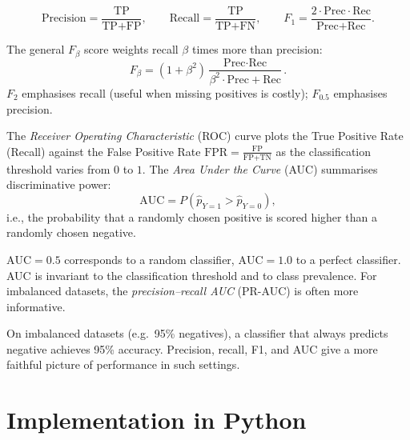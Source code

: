 \begin{definition}
\[
    \text{Precision} = \frac{\text{TP}}{\text{TP}+\text{FP}},
    \qquad
    \text{Recall} = \frac{\text{TP}}{\text{TP}+\text{FN}},
    \qquad
    F_1 = \frac{2 \cdot \text{Prec} \cdot \text{Rec}}{\text{Prec}+\text{Rec}}.
\]
\end{definition}

\begin{proposition}
The general $F_\beta$ score weights recall $\beta$ times more than precision:
\[
    F_\beta = (1+\beta^2)\frac{\text{Prec}\cdot\text{Rec}}{\beta^2\cdot\text{Prec}+\text{Rec}}.
\]
$F_2$ emphasises recall (useful when missing positives is costly); $F_{0.5}$ emphasises precision.
\end{proposition}

\begin{definition}
The \emph{Receiver Operating Characteristic} (ROC) curve plots the True Positive Rate (Recall) against the False Positive Rate $\text{FPR} = \frac{\text{FP}}{\text{FP}+\text{TN}}$ as the classification threshold varies from $0$ to $1$. The \emph{Area Under the Curve} (AUC) summarises discriminative power:
\[
    \text{AUC} = P(\hat{p}_{Y=1} > \hat{p}_{Y=0}),
\]
i.e., the probability that a randomly chosen positive is scored higher than a randomly chosen negative.
\end{definition}

\begin{proposition}
$\text{AUC} = 0.5$ corresponds to a random classifier, $\text{AUC} = 1.0$ to a perfect classifier. AUC is invariant to the classification threshold and to class prevalence. For imbalanced datasets, the \emph{precision--recall AUC} (PR-AUC) is often more informative.
\end{proposition}

\begin{warning}[title=\textbf{Accuracy Is Not Enough}]
On imbalanced datasets (e.g.\ 95\% negatives), a classifier that always predicts negative achieves 95\% accuracy. Precision, recall, F1, and AUC give a more faithful picture of performance in such settings.
\end{warning}

\section{Implementation in Python}

